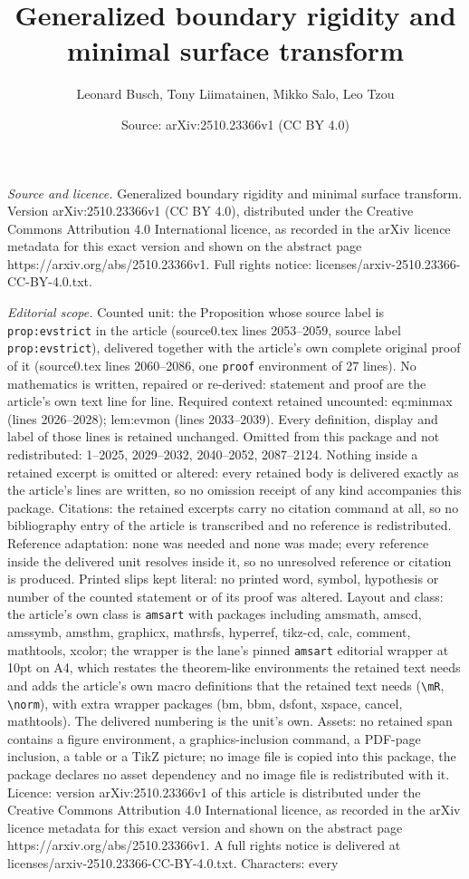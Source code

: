 \documentclass[10pt,a4paper]{amsart}
\title[Generalized boundary rigidity and minimal surface transform]{Generalized boundary rigidity and minimal surface transform}
\author{Leonard Busch, Tony Liimatainen, Mikko Salo, Leo Tzou}
\date{Source: arXiv:2510.23366v1 (CC BY 4.0)}
\begin{document}
\maketitle

\noindent\emph{Source and licence.} Generalized boundary rigidity and minimal surface transform. Version arXiv:2510.23366v1 (CC BY 4.0), distributed under the Creative Commons Attribution 4.0 International licence, as recorded in the arXiv licence metadata for this exact version and shown on the abstract page https://arxiv.org/abs/2510.23366v1. Full rights notice: licenses/arxiv-2510.23366-CC-BY-4.0.txt.\par\smallskip

\noindent\textit{Editorial scope.} Counted unit: the Proposition whose source label is \texttt{prop:evstrict} in the article (source0.tex lines 2053--2059, source label \texttt{prop:evstrict}), delivered together with the article's own complete original proof of it (source0.tex lines 2060--2086, one \texttt{proof} environment of 27 lines). No mathematics is written, repaired or re-derived: statement and proof are the article's own text line for line. Required context retained uncounted: eq:minmax (lines 2026--2028); lem:evmon (lines 2033--2039). Every definition, display and label of those lines is retained unchanged. Omitted from this package and not redistributed: 1--2025, 2029--2032, 2040--2052, 2087--2124. Nothing inside a retained excerpt is omitted or altered: every retained body is delivered exactly as the article's lines are written, so no omission receipt of any kind accompanies this package. Citations: the retained excerpts carry no citation command at all, so no bibliography entry of the article is transcribed and no reference is redistributed. Reference adaptation: none was needed and none was made; every reference inside the delivered unit resolves inside it, so no unresolved reference or citation is produced. Printed slips kept literal: no printed word, symbol, hypothesis or number of the counted statement or of its proof was altered. Layout and class: the article's own class is \texttt{amsart} with packages including amsmath, amscd, amssymb, amsthm, graphicx, mathrsfs, hyperref, tikz-cd, calc, comment, mathtools, xcolor; the wrapper is the lane's pinned \texttt{amsart} editorial wrapper at 10pt on A4, which restates the theorem-like environments the retained text needs and adds the article's own macro definitions that the retained text needs (\texttt{\textbackslash mR}, \texttt{\textbackslash norm}), with extra wrapper packages (bm, bbm, dsfont, xspace, cancel, mathtools). The delivered numbering is the unit's own. Assets: no retained span contains a figure environment, a graphics-inclusion command, a PDF-page inclusion, a table or a TikZ picture; no image file is copied into this package, the package declares no asset dependency and no image file is redistributed with it. Licence: version arXiv:2510.23366v1 of this article is distributed under the Creative Commons Attribution 4.0 International licence, as recorded in the arXiv licence metadata for this exact version and shown on the abstract page https://arxiv.org/abs/2510.23366v1. A full rights notice is delivered at licenses/arxiv-2510.23366-CC-BY-4.0.txt. Characters: every 
\end{document}
